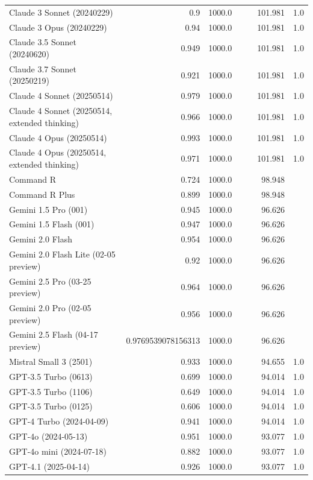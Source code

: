 \begin{table}[htp]
{\begin{tabular}{lrrrrrr}
Claude 3 Sonnet (20240229) & 0.9 & 1000.0 &  &  & 101.981 & 1.0 \\
Claude 3 Opus (20240229) & 0.94 & 1000.0 &  &  & 101.981 & 1.0 \\
Claude 3.5 Sonnet (20240620) & 0.949 & 1000.0 &  &  & 101.981 & 1.0 \\
Claude 3.7 Sonnet (20250219) & 0.921 & 1000.0 &  &  & 101.981 & 1.0 \\
Claude 4 Sonnet (20250514) & 0.979 & 1000.0 &  &  & 101.981 & 1.0 \\
Claude 4 Sonnet (20250514, extended thinking) & 0.966 & 1000.0 &  &  & 101.981 & 1.0 \\
Claude 4 Opus (20250514) & 0.993 & 1000.0 &  &  & 101.981 & 1.0 \\
Claude 4 Opus (20250514, extended thinking) & 0.971 & 1000.0 &  &  & 101.981 & 1.0 \\
Command R & 0.724 & 1000.0 &  &  & 98.948 &  \\
Command R Plus & 0.899 & 1000.0 &  &  & 98.948 &  \\
Gemini 1.5 Pro (001) & 0.945 & 1000.0 &  &  & 96.626 &  \\
Gemini 1.5 Flash (001) & 0.947 & 1000.0 &  &  & 96.626 &  \\
Gemini 2.0 Flash & 0.954 & 1000.0 &  &  & 96.626 &  \\
Gemini 2.0 Flash Lite (02-05 preview) & 0.92 & 1000.0 &  &  & 96.626 &  \\
Gemini 2.5 Pro (03-25 preview) & 0.964 & 1000.0 &  &  & 96.626 &  \\
Gemini 2.0 Pro (02-05 preview) & 0.956 & 1000.0 &  &  & 96.626 &  \\
Gemini 2.5 Flash (04-17 preview) & 0.9769539078156313 & 1000.0 &  &  & 96.626 &  \\
Mistral Small 3 (2501) & 0.933 & 1000.0 &  &  & 94.655 & 1.0 \\
GPT-3.5 Turbo (0613) & 0.699 & 1000.0 &  &  & 94.014 & 1.0 \\
GPT-3.5 Turbo (1106) & 0.649 & 1000.0 &  &  & 94.014 & 1.0 \\
GPT-3.5 Turbo (0125) & 0.606 & 1000.0 &  &  & 94.014 & 1.0 \\
GPT-4 Turbo (2024-04-09) & 0.941 & 1000.0 &  &  & 94.014 & 1.0 \\
GPT-4o (2024-05-13) & 0.951 & 1000.0 &  &  & 93.077 & 1.0 \\
GPT-4o mini (2024-07-18) & 0.882 & 1000.0 &  &  & 93.077 & 1.0 \\
GPT-4.1 (2025-04-14) & 0.926 & 1000.0 &  &  & 93.077 & 1.0 \\

\end{tabular}}
\end{table}

